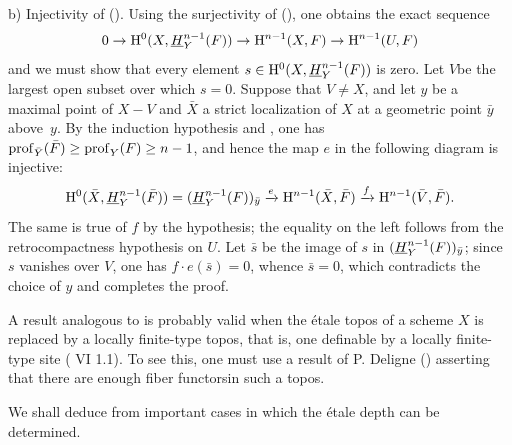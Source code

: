 b) Injectivity of (). Using the surjectivity of (), one obtains the exact sequence
$$0\to \mathrm H^0(X, {\mathop{\underline{H}}\nolimits}_Y^{n-1}(F))\to \mathrm H^{n-1}(X, F)\to \mathrm H^{n-1}(U, F)$$
and we must show that every element $s\in \mathrm H^0(X, {\mathop{\underline{H}}\nolimits}_Y^{n-1}(F))$ is zero. Let $V$\pageoriginale be the largest open subset over which $s=0$. Suppose that $V\neq X$, and let $y$ be a maximal point of $X-V$ and $\bar X$ a strict localization of $X$ at a geometric point $\bar y$ above~$y$. By the induction hypothesis and , one has $\operatorname{prof}_{\bar Y}(\bar F)\geq \operatorname{prof}_Y(F)\geq n-1$, and hence the map $e$ in the following diagram is injective:
$$
\mathrm H^0(\bar X, {\mathop{\underline{H}}\nolimits}_Y^{n-1}(\bar F))= ({\mathop{\underline{H}}\nolimits}_Y^{n-1}(F))_{\bar y}\xrightarrow{e} \mathrm H^{n-1}(\bar X, \bar F) \xrightarrow{f} \mathrm H^{n-1}(\bar V, \bar F).
$$
The same is true of $f$ by the hypothesis; the equality on the left follows from the retrocompactness hypothesis on $U$. Let $\bar s$ be the image of $s$ in $({\mathop{\underline{H}}\nolimits}_Y^{n-1}(F))_{\bar y}$; since $s$ vanishes over $V$, one has $f\cdot e(\bar s)=0$, whence $\bar s=0$, which contradicts the choice of $y$ and completes the proof.

\begin{remarque} \label{XIV.1.9}
A result analogous to  is probably valid when the étale topos of a scheme $X$ is replaced by a \og locally finite-type topos\fg, that is, one definable by a locally finite-type site ( VI 1.1). To see this, one must use a result of P. Deligne (\SGA {}) asserting that there are \og enough fiber functors\fg in such a topos.
\end{remarque}

We shall deduce from  important cases in which the étale depth can be determined.

